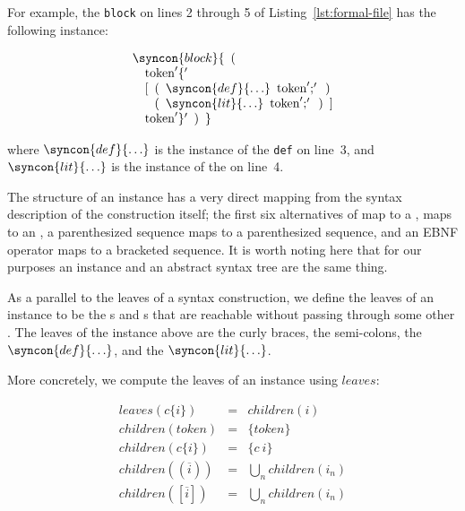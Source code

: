 \documentclass{kththesis}
\begin{document}
For example, the \texttt{block} on lines 2 through 5 of Listing~\ref{lst:formal-file} has the following instance:

$$
\begin{array}{l}
\syncon{block}\{ \enspace \text{(} \\
\quad \text{token}'\{' \\
\quad \text{[} \enspace \text{(} \enspace \syncon{def}\{\ldots\} \enspace \text{token}';' \enspace \text{)} \\
\quad \hphantom{\text{[}} \enspace \text{(} \enspace \syncon{lit}\{\ldots\} \enspace \text{token}';' \enspace \text{)} \enspace \text{]} \\
\quad \text{token}'\}' \enspace \text{)} \enspace \} \\
\end{array}
$$

where $\syncon{def}\{\ldots\}$ is the instance of the \texttt{def} on line~3, and $\syncon{lit}\{\ldots\}$ is the instance of the  on line~4.

The structure of an instance has a very direct mapping from the syntax description of the construction itself; the first six alternatives of  map to a ,  maps to an , a parenthesized sequence maps to a parenthesized sequence, and an EBNF operator maps to a bracketed sequence. It is worth noting here that for our purposes an instance and an abstract syntax tree are the same thing.

As a parallel to the leaves of a syntax construction, we define the leaves of an instance to be the s and s that are reachable without passing through some other . The leaves of the  instance above are the curly braces, the semi-colons, the $\syncon{def}\{\ldots\}$, and the $\syncon{lit}\{\ldots\}$.

\newcommand{\leaves}{\ensuremath{\mathit{leaves}}}

More concretely, we compute the leaves of an instance using \leaves:

\newcommand{\children}{\ensuremath{\mathit{children}}}
$$
\begin{array}{rcl}
\leaves(c\{i\}) & = & children(i) \\
\children(token) & = & \{token\} \\
\children(c\{i\}) & = & \{c~i\} \\
\children((\overline{i})) & = & \bigcup\limits_n \children(i_n) \\
\children([\overline{i}]) & = & \bigcup\limits_n \children(i_n) \\
\end{array}
$$
\let\children\undefined
\end{document}
